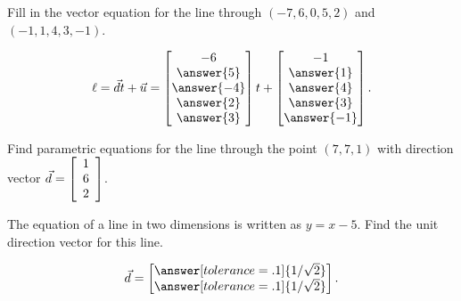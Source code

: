 \documentclass{ximera}
\author{Zack Reed}
\begin{document}
\begin{problem}
  Fill in the vector equation for the line through $(-7,6,0,5,2)$ and
  $(-1,1,4,3,-1)$.

  $$\ell=\vec{d}t+\vec{u}=\begin{bmatrix}
    -6\\
    \answer{5}\\
    \answer{-4}\\
    \answer{2}\\
    \answer{3}
  \end{bmatrix}t+\begin{bmatrix}
    -1\\
    \answer{1}\\
    \answer{4}\\
    \answer{3}\\
    \answer{-1}
  \end{bmatrix}.$$
\end{problem}

\begin{problem}
  Find parametric equations for the line through the point
  $(7,7,1)$ with direction vector
  $\vect{d} = \startmat{c} 1 \\ 6 \\ 2 \stopmat$.
\end{problem}


\begin{problem}
  The equation of a line in two dimensions is written as $y=x-5$. Find
  the unit direction vector for this line.

  $$\vec{d}=\begin{bmatrix}
    \answer[tolerance=.1]{1/\sqrt{2}}\\
    \answer[tolerance=.1]{1/\sqrt{2}}
  \end{bmatrix}.$$
\end{problem}
\end{document}
